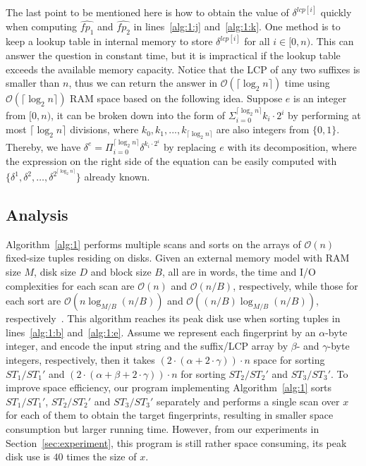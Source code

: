 \documentclass[10pt,journal,compsoc]{IEEEtran}
\begin{document}
The last point to be mentioned here is how to obtain the value of $\delta^{lcp[i]}$ quickly when computing $\hat{fp_1}$ and $\hat{fp_2}$ in lines~\ref{alg:1:j} and~\ref{alg:1:k}. One method is to keep a lookup table in internal memory to store $\delta^{lcp[i]}$ for all $i \in [0, n)$. This can answer the question in constant time, but it is impractical if the lookup table exceeds the available memory capacity. Notice that the LCP of any two suffixes is smaller than $n$, thus we can return the answer in $\mathcal{O}(\lceil \log_2{n} \rceil)$ time using $\mathcal{O}(\lceil \log_2{n} \rceil)$ RAM space based on the following idea. Suppose $e$ is an integer from $[0, n)$, it can be broken down into the form of $\Sigma_{i = 0}^{\lceil \log_2{n} \rceil}{k_i \cdot 2^i}$ by performing at most $\lceil \log_2{n} \rceil$ divisions, where $k_0, k_1, ..., k_{\lceil \log_2{n} \rceil}$ are also integers from $\{0, 1\}$. Thereby, we have $\delta^e = \Pi_{i = 0}^{\lceil \log_2{n} \rceil}{\delta}^{k_i \cdot 2^i}$ by replacing $e$ with its decomposition, where the expression on the right side of the equation can be easily computed with $\{{\delta}^{1}, {\delta}^{2}, \dots, {\delta}^{2^{\lceil \log_2{n} \rceil}} \}$ already known.

\subsection{Analysis} \label{sec:method1:analysis}

Algorithm~\ref{alg:1} performs multiple scans and sorts on the arrays of $\mathcal{O}(n)$ fixed-size tuples residing on disks. Given an external memory model with RAM size $M$, disk size $D$ and block size $B$, all are in words, the time and I/O complexities for each scan are $\mathcal{O}(n)$ and $\mathcal{O}(n / B)$, respectively, while those for each sort are $\mathcal{O}(n\log_{M/ B}(n / B))$ and $\mathcal{O}((n / B)\log_{M / B}(n / B))$, respectively~\cite{Arge2013}. This algorithm reaches its peak disk use when sorting tuples in lines~\ref{alg:1:b} and~\ref{alg:1:e}. Assume we represent each fingerprint by an $\alpha$-byte integer, and encode the input string and the suffix/LCP array by $\beta$- and $\gamma$-byte integers, respectively, then it takes $(2 \cdot (\alpha + 2 \cdot \gamma)) \cdot n$ space for sorting $ST_1/ST_1'$ and $(2 \cdot (\alpha + \beta + 2 \cdot \gamma)) \cdot n$ for sorting $ST_2/ST_2'$ and $ST_3/ST_3'$. To improve space efficiency, our program implementing Algorithm~\ref{alg:1} sorts $ST_1/ST_1'$, $ST_2/ST_2'$ and $ST_3/ST_3'$ separately and performs a single scan over $x$ for each of them to obtain the target fingerprints, resulting in smaller space consumption but larger running time. However, from our experiments in Section~\ref{sec:experiment}, this program is still rather space consuming, its peak disk use is $40$ times the size of $x$. 
\end{document}
